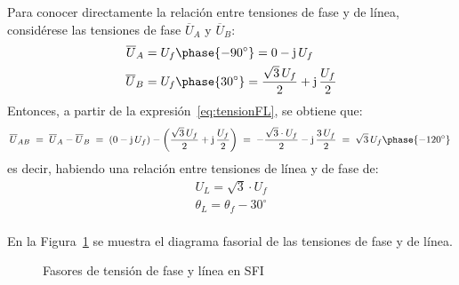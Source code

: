 	Para conocer directamente la relación entre tensiones de fase y de línea, considérese las tensiones de fase $\overline{U}_A$ y $\overline{U}_B$: 
	\begin{align*}
		\overline{U}_A &= U_f\phase{-90^\circ}=0-\mathrm{j}\,U_f
		\\
		\overline{U}_B &= U_f\phase{30^\circ}=\dfrac{\sqrt{3}\,U_f}{2}+\mathrm{j}\,\dfrac{U_f}{2}
	\end{align*}
	Entonces, a partir de la expresión~\eqref{eq:tensionFL}, se obtiene que: 
	\begin{equation*}
		\overline{U}_{AB} \;=\; \overline{U}_{A}-\overline{U}_{B} \;=\; (0-\mathrm{j}\,U_f)-\left(\dfrac{\sqrt{3}\,U_f}{2}+\mathrm{j}\,\dfrac{U_f}{2}\right) \;=\; -\dfrac{\sqrt{3}\cdot U_f}{2}-\mathrm{j}\,\dfrac{3\,U_f}{2} \;=\; \sqrt{3}\,U_f \phase{-120^\circ}\,
	\end{equation*}
	es decir, habiendo una relación entre tensiones de línea y de fase de: 
	\begin{equation}\label{eq:sfi_fase-linea}
		\boxed{
			\begin{array}{l}
				U_L = \sqrt{3}\cdot U_f\\
				\theta_L = \theta_f - 30^\circ\\
			\end{array}
		} 
	\end{equation}
	
	En la Figura~\ref{fig:linea-fase-SFI} se muestra el diagrama fasorial de las tensiones de fase y de línea. 

	\begin{figure}[H]
		\centering
		\hfil
		\caption{Fasores de tensión de fase y línea en SFI}
		\label{fig:linea-fase-SFI}
	\end{figure}
	
